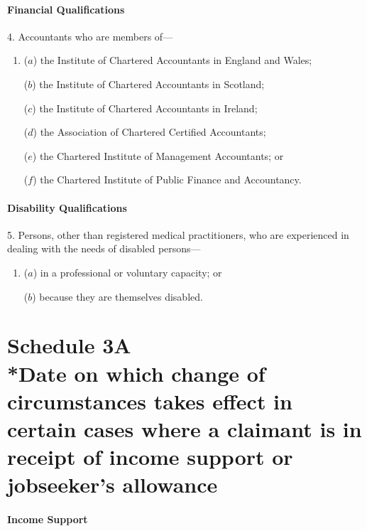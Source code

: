 \documentclass[12pt,a4paper]{article}
\begin{document}
\subsection*{Financial Qualifications}

4.  Accountants who are members of—
\begin{enumerate}\item[]
($a$) the Institute of Chartered Accountants in England and Wales;

($b$) the Institute of Chartered Accountants in Scotland;

($c$) the Institute of Chartered Accountants in Ireland;

($d$) the Association of Chartered Certified Accountants;

($e$) the Chartered Institute of Management Accountants; or

($f$) the Chartered Institute of Public Finance and Accountancy.
\end{enumerate}

\subsection*{Disability Qualifications}

5.  Persons, other than registered medical practitioners, who are experienced in dealing with the needs of disabled persons—
\begin{enumerate}\item[]
($a$) in a professional or voluntary capacity; or

($b$) because they are themselves disabled.
\end{enumerate}

\part[Schedule 3A --- Date on which change of circumstances takes effect in certain cases where a claimant is in receipt of income support or jobseeker’s allowance]{Schedule 3A\\*Date on which change of circumstances takes effect in certain cases where a claimant is in receipt of income support or jobseeker’s allowance}

\renewcommand\parthead{--- Schedule 3A}

\subsection*{Income Support}
\end{document}
